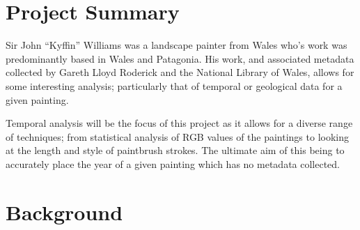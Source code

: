 \documentclass[11pt,fleqn,twoside]{article}
\begin{document}

\mmpversion{\version}

\mmp

\setcounter{tocdepth}{3} %
\tableofcontents
\listoffigures
\listoftables

\newpage

\section{Project Summary}
Sir John ``Kyffin'' Williams was a landscape painter from Wales who's work was predominantly based 
in Wales and Patagonia. His work, and associated metadata collected by Gareth Lloyd Roderick and 
the National Library of Wales, allows for some interesting analysis; particularly that of temporal 
or geological data for a given painting.

Temporal analysis will be the focus of this project as it allows for a diverse range of techniques;
from statistical analysis of RGB values of the paintings to looking at the length and style of 
paintbrush strokes. The ultimate aim of this being to accurately place the year of a given painting
which has no metadata collected.


\section{Background}
\end{document}
